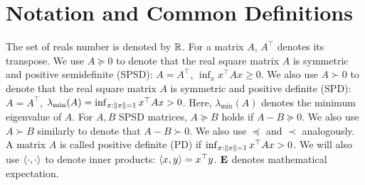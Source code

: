 \section{Notation and Common Definitions}
\label{sec:not}

The set of reals number is denoted by $\mathbb{R}$.
For a matrix $A$, $A^\top$ denotes its transpose.
We use $A\succeq 0$ to denote that the real  square matrix $A$ is symmetric and positive semidefinite (SPSD):
$A = A^\top$, $\inf_x x^\top A x\ge 0$.
We also use $A \succ 0$ to denote that the real square matrix $A$ is symmetric and positive definite (SPD):
$A = A^\top$, $\lambda_{\min}(A) =\inf_{x:\left\| x\right\|=1} x^\top A x>0$. Here, $\lambda_{\min}(A)$ denotes the minimum eigenvalue of $A$.
For $A,B$ SPSD matrices, $A\succeq B$ holds if $A-B\succeq 0$.
We also use $A\succ B$ similarly to denote that $A-B \succ 0$.
We also use $\preceq$ and $\prec$ analogously.
%
A matrix $A$ is called positive definite (PD) if $\inf_{x:\left\| x\right\|=1} x^\top A x >0$.
%
We will also use $\langle\cdot,\cdot\rangle$ to denote inner products: $\langle x,y\rangle = x^\top y$.
%
$\mathbf{E}$ denotes mathematical expectation.



